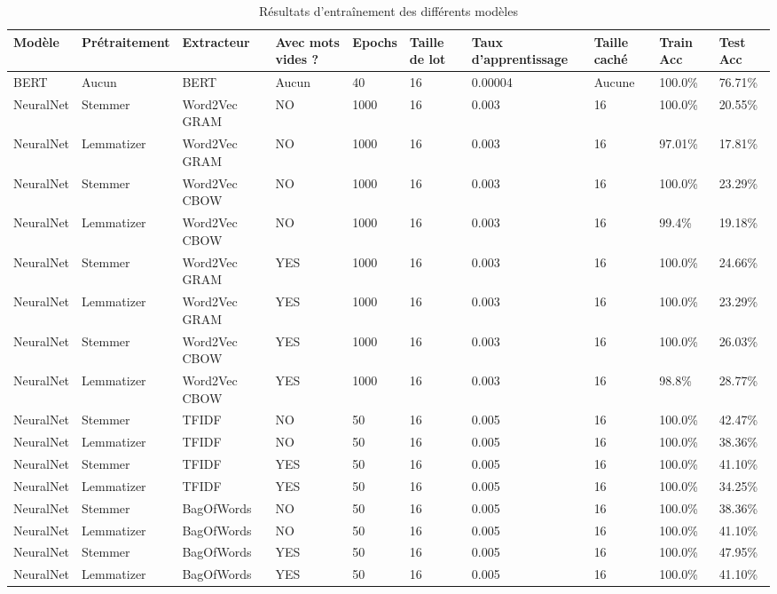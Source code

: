\documentclass{rapport}
\begin{document}
\begin{table}[h]
\centering
\begin{adjustbox}{width=1.2\textwidth, center}
\begin{tabular}{||l|l|m{2.2cm}|m{1.5cm}|l|m{1.2cm}|m{1.7cm}|m{1.5cm}|m{1.5cm}|l||}
\hline
\textbf{Modèle} & \textbf{Prétraitement} & \textbf{Extracteur} & \textbf{Avec mots vides ?} & \textbf{Epochs} & \textbf{Taille de lot} & \textbf{Taux d'apprentissage} & \textbf{Taille caché} & \textbf{Train Acc} & \textbf{Test Acc} \\ \hline
BERT & Aucun & BERT & Aucun & 40 & 16 & 0.00004 & Aucune & 100.0\% & 76.71\% \\ 
\hline
NeuralNet & Stemmer & Word2Vec GRAM & NO & 1000 & 16 & 0.003 & 16 & 100.0\% & 20.55\% \\ 
\hline
NeuralNet & Lemmatizer & Word2Vec GRAM & NO & 1000 & 16 & 0.003 & 16 & 97.01\% & 17.81\% \\ 
\hline
NeuralNet & Stemmer & Word2Vec CBOW & NO & 1000 & 16 & 0.003 & 16 & 100.0\% & 23.29\% \\ 
\hline
NeuralNet & Lemmatizer & Word2Vec CBOW & NO & 1000 & 16 & 0.003 & 16 & 99.4\% & 19.18\% \\ 
\hline
NeuralNet & Stemmer & Word2Vec GRAM & YES & 1000 & 16 & 0.003 & 16 & 100.0\% & 24.66\% \\ 
\hline
NeuralNet & Lemmatizer & Word2Vec GRAM & YES & 1000 & 16 & 0.003 & 16 & 100.0\% & 23.29\% \\ 
\hline
NeuralNet & Stemmer & Word2Vec CBOW & YES & 1000 & 16 & 0.003 & 16 & 100.0\% & 26.03\% \\ 
\hline
NeuralNet & Lemmatizer & Word2Vec CBOW & YES & 1000 & 16 & 0.003 & 16 & 98.8\% & 28.77\% \\ 
\hline
NeuralNet & Stemmer & TFIDF & NO & 50 & 16 & 0.005 & 16 & 100.0\% & 42.47\% \\ 
\hline
NeuralNet & Lemmatizer & TFIDF & NO & 50 & 16 & 0.005 & 16 & 100.0\% & 38.36\% \\ 
\hline
NeuralNet & Stemmer & TFIDF & YES & 50 & 16 & 0.005 & 16 & 100.0\% & 41.10\% \\ 
\hline
NeuralNet & Lemmatizer & TFIDF & YES & 50 & 16 & 0.005 & 16 & 100.0\% & 34.25\% \\ 
\hline
NeuralNet & Stemmer & BagOfWords & NO & 50 & 16 & 0.005 & 16 & 100.0\% & 38.36\% \\ 
\hline
NeuralNet & Lemmatizer & BagOfWords & NO & 50 & 16 & 0.005 & 16 & 100.0\% & 41.10\% \\ 
\hline
NeuralNet & Stemmer & BagOfWords & YES & 50 & 16 & 0.005 & 16 & 100.0\% & 47.95\% \\ 
\hline
NeuralNet & Lemmatizer & BagOfWords & YES & 50 & 16 & 0.005 & 16 & 100.0\% & 41.10\% \\ 
\hline
\end{tabular}
\end{adjustbox}
\label{table:train}
\caption{Résultats d'entraînement des différents modèles}
\end{table}
\end{document}
